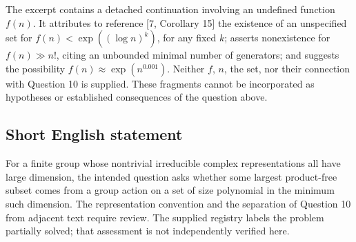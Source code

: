 \documentclass[11pt]{article}
\begin{document}
The excerpt contains a detached continuation involving an undefined function \(f(n)\). It attributes to reference [7, Corollary 15] the existence of an unspecified set for \(f(n)<\exp((\log n)^k)\), for any fixed \(k\); asserts nonexistence for \(f(n)\gg n!\), citing an unbounded minimal number of generators; and suggests the possibility \(f(n)\approx\exp(n^{0.001})\). Neither \(f\), \(n\), the set, nor their connection with Question 10 is supplied. These fragments cannot be incorporated as hypotheses or established consequences of the question above.
\subsection{Short English statement}
For a finite group whose nontrivial irreducible complex representations all have large dimension, the intended question asks whether some largest product-free subset comes from a group action on a set of size polynomial in the minimum such dimension. The representation convention and the separation of Question 10 from adjacent text require review. The supplied registry labels the problem partially solved; that assessment is not independently verified here.
\end{document}
